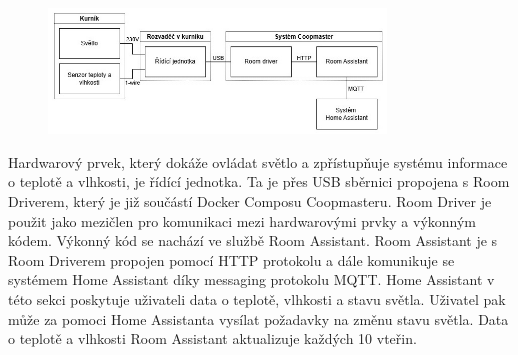 \begin{figure}[H]
    \centering
    \includegraphics[width=0.8\textwidth]{img/svetlo_teplo_vlhkost}
    \label{fig:svetlo_teplo_vlhkost}
\end{figure}

Hardwarový prvek, který dokáže ovládat světlo a zpřístupňuje systému informace o teplotě a vlhkosti, je řídící jednotka.
Ta je přes USB sběrnici propojena s Room Driverem, který je již součástí Docker Composu Coopmasteru.
Room Driver je použit jako mezičlen pro komunikaci mezi hardwarovými prvky a výkonným kódem.
Výkonný kód se nachází ve službě Room Assistant.
Room Assistant je s Room Driverem propojen pomocí HTTP protokolu a dále komunikuje se systémem Home Assistant díky messaging protokolu MQTT.
Home Assistant v této sekci poskytuje uživateli data o teplotě, vlhkosti a stavu světla.
Uživatel pak může za pomoci Home Assistanta vysílat požadavky na změnu stavu světla.
Data o teplotě a vlhkosti Room Assistant aktualizuje každých 10 vteřin.


